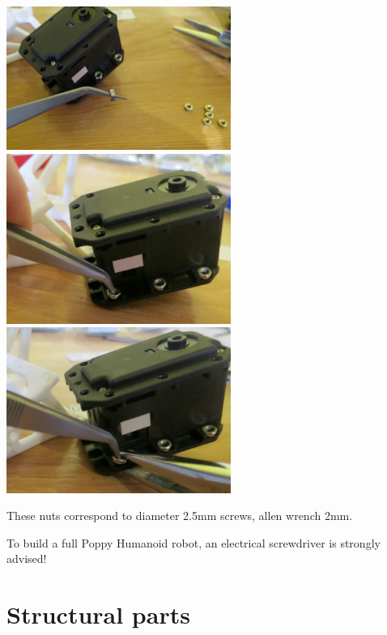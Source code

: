 \documentclass{article}
\begin{document}
 \begin{center}
  \includegraphics[width=0.55\textwidth]{nuts1}
  \includegraphics[width=0.55\textwidth]{nuts2}
  \includegraphics[width=0.55\textwidth]{nuts3}
 \end{center}
 
 These nuts correspond to diameter 2.5mm screws, allen wrench 2mm.
 
 To build a full Poppy Humanoid robot, an electrical screwdriver is strongly advised!

\section{Structural parts}
\end{document}
